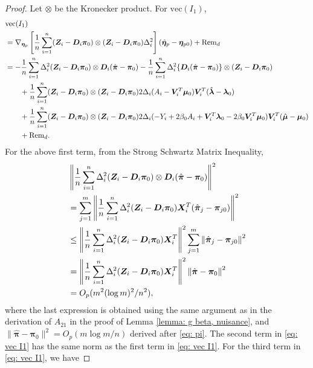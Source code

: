 \documentclass[12pt]{article}
\begin{document}
{\begin{proof}
Let $ \otimes $ be the Kronecker product. For $  \text{vec} (I_1) $, 
	\begin{align}
	 & \text{vec} (I_1)  \nonumber \\
		& = \nabla_{\bm \eta_p}  \left[ \frac{1}{n} \sum_{i=1}^{n}  (\bm{Z}_i - \bm D_i {\bm\pi}_0) \otimes  (\bm{Z}_i - \bm D_i {\bm\pi}_0) \Delta_i^2  \right]  (\hat{\bm \eta}_p- \bm \eta_{p0}) + \text{Rem}_d \nonumber\\
		&= - \frac1n \sum_{i=1}^{n} \Delta_i^2 (\bm{Z}_i - \bm D_i \bm\pi_0 ) \otimes  \bm D_i (\hat{\bm\pi}- \bm\pi_0 )  - \frac1n \sum_{i=1}^{n} \Delta_i^2  \{ \bm D_i (\hat{\bm\pi}- \bm\pi_0 )\}\otimes (\bm{Z}_i - \bm D_i \bm\pi_0 ) \nonumber\\
		&\qquad + \frac{1}{n} \sum_{i=1}^{n}  (\bm{Z}_i - \bm D_i {\bm\pi}_0) \otimes  (\bm{Z}_i - \bm D_i {\bm\pi}_0) 2\Delta_i (A_i - \bm{V}_i^T \bm\mu_0) \bm{V}_i^T (\hat{\bm \lambda}- \bm\lambda_0) \nonumber \\
		&\qquad + \frac{1}{n} \sum_{i=1}^{n}  (\bm{Z}_i - \bm D_i {\bm\pi}_0) \otimes  (\bm{Z}_i - \bm D_i {\bm\pi}_0) 2\Delta_i (- Y_i + 2\beta_0 A_i + \bm{V}_i^T \bm\lambda_0 - 2\beta_0 \bm{V}_i^T\bm\mu_0) \bm{V}_i^T (\hat{\bm \mu}- \bm\mu_0)\nonumber\\
		&\qquad + \text{Rem}_d.  \label{eq: vec I1}
	\end{align}
For the above first term, from the Strong Schwartz Matrix Inequality, 
\begin{align*}
	& \left\| \frac1n \sum_{i=1}^{n} \Delta_i^2 (\bm{Z}_i - \bm D_i \bm\pi_0 ) \otimes  \bm D_i (\hat{\bm\pi}- \bm\pi_0 )  \right\|^2 \nonumber\\
	&= \sum_{j=1}^{m}   	\left\| \frac1n \sum_{i=1}^{n} \Delta_i^2 (\bm{Z}_i - \bm D_i \bm\pi_0 )   \bm X_i^T (\hat{\bm\pi}_j- \bm\pi_{j0} )  \right\|^2  \\
	&\leq 	\left\| \frac1n \sum_{i=1}^{n} \Delta_i^2 (\bm{Z}_i - \bm D_i \bm\pi_0 )   \bm X_i^T   \right\|^2  \sum_{j=1}^{m}     \left\| \hat{\bm\pi}_j- \bm\pi_{j0}  \right\|^2 \\
	&= 	\left\| \frac1n \sum_{i=1}^{n} \Delta_i^2 (\bm{Z}_i - \bm D_i \bm\pi_0 )   \bm X_i^T   \right\|^2    \left\| \hat{\bm\pi}- \bm\pi_{0}  \right\|^2 \\
	&= O_p(m^2(\log m)^2/n^2),
\end{align*} 
where the last expression is obtained using the same argument as in the derivation  of $ A_{21} $ in the proof of Lemma \ref{lemma: g beta, nuisance}, and $ \| \hat{\bm\pi} - \bm\pi_0 \|^2  = O_p (m\log m/n ) $ derived after \eqref{eq: pi}. The second term in \eqref{eq: vec I1} has the same norm as the first term in \eqref{eq: vec I1}.  For the third term in \eqref{eq: vec I1}, we have 

\end{proof}}
\end{document}
